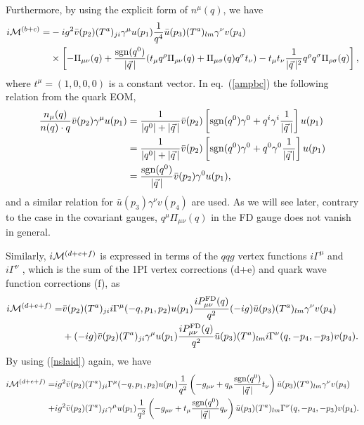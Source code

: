 \documentclass[preprint,amsmath,amssymb,superscriptaddress, floatfix,nofootinbib]{revtex4}
\begin{document}
%
Furthermore, by using the explicit form of $n^{\mu}(q)$,  we have 
%
\begin{align}
i{\cal M}^{(b+c)}  =&
-ig^2 \bar{v}(p_2)(T^a)_{ji}\gamma^{\mu}u(p_1) \frac{1}{q^4}
\bar{u}(p_3)(T^a)_{lm}\gamma^{\nu}v(p_4) 
\nonumber \\
& \times \left[ -\Pi_{\mu\nu}(q)  +\frac{{\rm sgn}(q^0)}{|\vec{q}\,|}
(t_{\mu}q^{\rho}\Pi_{\rho\nu}(q) + \Pi_{\mu\sigma}(q) q^{\sigma}t_{\nu}) 
-t_{\mu}t_{\nu}\frac{1}{|\vec{q}\,|^2}q^{\rho}q^{\sigma}\Pi_{\rho\sigma}(q) \right] , 
\label{ampbc}
\end{align}
where $t^{\mu}=(1,0,0,0)$ is a constant vector. 
In eq.~(\ref{ampbc}) the following relation from the quark EOM, 
%
\begin{align}
 \frac{n_{\mu}(q)}{n(q)\cdot q}\bar{v}(p_2) \gamma^{\mu} u(p_1) 
&= 
\frac{1}{|q^0|+|\vec{q}\,|}\bar{v}(p_2) \left[ {\rm sgn}(q^0)\gamma^0 
+q^i\gamma^i\frac{1}{|\vec{q}\,|} \right] u(p_1)  
\nonumber \\
& =\frac{1}{|q^0|+|\vec{q}\,|}\bar{v}(p_2) \left[ 
{\rm sgn}(q^0)\gamma^0 +q^0\gamma^0\frac{1}{|\vec{q}\,|} \right]  u(p_1) 
\nonumber \\
&
=\frac{{\rm sgn}(q^0)}{|\vec{q}\,|}\bar{v}(p_2) \gamma^0 u(p_1) ,
\label{nslaid} 
\end{align} 
and a similar relation for $\bar{u}(p_3)\gamma^{\nu}v(p_4)$ are used. 
%
%
As we will see later, 
contrary to the case in the covariant gauges, 
$q^{\mu} \Pi_{\mu\nu}(q)$ in the FD gauge does not vanish in general. 

Similarly, $i{\cal M}^{(d+e+f)}$ is expressed in terms of the 
${q}qg$ vertex functions $i\Gamma^{\mu}$ and $i\Gamma^{\nu}$ , 
which is the sum of the 1PI vertex corrections (d+e) and 
quark wave function corrections (f), as 
%
\begin{align}
i{\cal M}^{(d+e+f)} = 
& \bar{v}(p_2)(T^a)_{ji}i\Gamma^{\mu}(-q,p_1,p_2)u(p_1)
\frac{iP^{\rm FD}_{\mu\nu}(q)}{q^2} 
(-ig)\bar{u}(p_3)(T^a)_{lm}\gamma^{\nu}v(p_4)
\nonumber \\
& + (-ig) \bar{v}(p_2)(T^a)_{ji}\gamma^{\mu}u(p_1)
\frac{iP^{\rm FD}_{\mu\nu}(q)}{q^2} 
\bar{u}(p_3)(T^a)_{lm}i\Gamma^{\nu}(q,-p_4,-p_3)v(p_4) . \label{eq6} 
\end{align}
%
By using (\ref{nslaid}) again, we have 
\begin{align}
i{\cal M}^{(d+e+f)} = & 
ig^2 \bar{v}(p_2)(T^a)_{ji}\Gamma^{\mu}(-q,p_1,p_2) u(p_1) \frac{1}{q^2}
\left( -g_{\mu\nu} + q_{\mu} \frac{{\rm sgn}(q^0)}{ |\vec{q}\,| }t_{\nu}  \right) 
\bar{u}(p_3)(T^a)_{lm} \gamma^{\nu} v(p_4) 
\nonumber \\
+ & 
ig^2 \bar{v}(p_2)(T^a)_{ji} \gamma^{\mu} u(p_1) \frac{1}{q^2}
\left( -g_{\mu\nu} + t_{\mu} \frac{{\rm sgn}(q^0)}{ |\vec{q}\,| } q_{\nu}  \right) 
 \bar{u}(p_3)(T^a)_{lm} \Gamma^{\nu}(q,-p_4,-p_3) v(p_4)  .
\label{mvertex3} 
\end{align}
\end{document}
